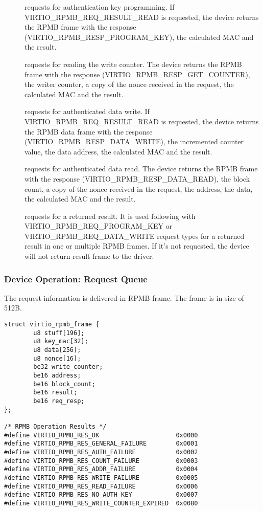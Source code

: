 \begin{description}
\item[] requests for authentication key programming.
  If VIRTIO_RPMB_REQ_RESULT_READ is requested, the device returns the RPMB frame with
  the response (VIRTIO_RPMB_RESP_PROGRAM_KEY), the calculated MAC and the result.

\item[] requests for reading the write counter.
   The device returns the RPMB frame with the response (VIRTIO_RPMB_RESP_GET_COUNTER),
   the writer counter, a copy of the nonce received in the request, the calculated
   MAC and the result.

\item[] requests for authenticated data write.
   If VIRTIO_RPMB_REQ_RESULT_READ is requested, the device returns the RPMB data
   frame with the response (VIRTIO_RPMB_RESP_DATA_WRITE), the incremented counter value,
   the data address, the calculated MAC and the result.

\item[] requests for authenticated data read.
   The device returns the RPMB frame with the response (VIRTIO_RPMB_RESP_DATA_READ),
   the block count, a copy of the nonce received in the request, the address,
   the data, the calculated MAC and the result.

\item[] requests for a returned result.
   It is used following with VIRTIO_RPMB_REQ_PROGRAM_KEY or VIRTIO_RPMB_REQ_DATA_WRITE
   request types for a returned result in one or multiple RPMB frames. If it's not
   requested, the device will not return result frame to the driver.
\end{description}


\subsubsection{Device Operation: Request Queue}\label{sec:Device Types / RPMB Device / Device Operation / Device Operation: Request Queue}

The request information is delivered in RPMB frame.
The frame is in size of 512B.

\begin{lstlisting}
struct virtio_rpmb_frame {
        u8 stuff[196];
        u8 key_mac[32];
        u8 data[256];
        u8 nonce[16];
        be32 write_counter;
        be16 address;
        be16 block_count;
        be16 result;
        be16 req_resp;
};

/* RPMB Operation Results */
#define VIRTIO_RPMB_RES_OK                     0x0000
#define VIRTIO_RPMB_RES_GENERAL_FAILURE        0x0001
#define VIRTIO_RPMB_RES_AUTH_FAILURE           0x0002
#define VIRTIO_RPMB_RES_COUNT_FAILURE          0x0003
#define VIRTIO_RPMB_RES_ADDR_FAILURE           0x0004
#define VIRTIO_RPMB_RES_WRITE_FAILURE          0x0005
#define VIRTIO_RPMB_RES_READ_FAILURE           0x0006
#define VIRTIO_RPMB_RES_NO_AUTH_KEY            0x0007
#define VIRTIO_RPMB_RES_WRITE_COUNTER_EXPIRED  0x0080
\end{lstlisting}


